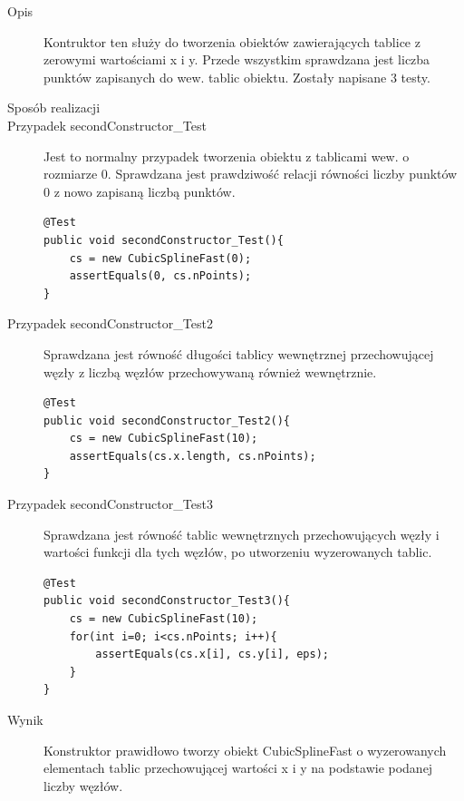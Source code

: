 \documentclass[12pt,a4paper,notitlepage]{article}
\begin{document}
\begin{description}
\item [Opis] Kontruktor ten służy do tworzenia obiektów zawierających tablice z zerowymi wartościami x i y.
Przede wszystkim sprawdzana jest liczba punktów zapisanych do wew. tablic obiektu. Zostały napisane 3 testy.
 
\item [Sposób realizacji]
\item [Przypadek secondConstructor\_Test] Jest to normalny przypadek tworzenia obiektu z tablicami wew. o rozmiarze 0. Sprawdzana jest prawdziwość relacji równości liczby punktów 0 z nowo zapisaną liczbą punktów.

\begin{lstlisting}
@Test
public void secondConstructor_Test(){
    cs = new CubicSplineFast(0);
    assertEquals(0, cs.nPoints);
}
\end{lstlisting}

\item [Przypadek secondConstructor\_Test2] Sprawdzana jest równość długości tablicy wewnętrznej przechowującej węzły z liczbą węzłów przechowywaną również wewnętrznie.

\begin{lstlisting}
@Test
public void secondConstructor_Test2(){
    cs = new CubicSplineFast(10);
    assertEquals(cs.x.length, cs.nPoints);
}
\end{lstlisting}

\item [Przypadek secondConstructor\_Test3] Sprawdzana jest równość tablic wewnętrznych przechowujących węzły i wartości funkcji dla tych węzłów, po utworzeniu wyzerowanych tablic.

\begin{lstlisting}
@Test
public void secondConstructor_Test3(){
	cs = new CubicSplineFast(10);
	for(int i=0; i<cs.nPoints; i++){
	    assertEquals(cs.x[i], cs.y[i], eps);
	}
}
\end{lstlisting}

\item [Wynik] Konstruktor prawidłowo tworzy obiekt CubicSplineFast o wyzerowanych elementach tablic przechowującej wartości x i y na podstawie podanej liczby węzłów.
\end{description}
\end{document}
